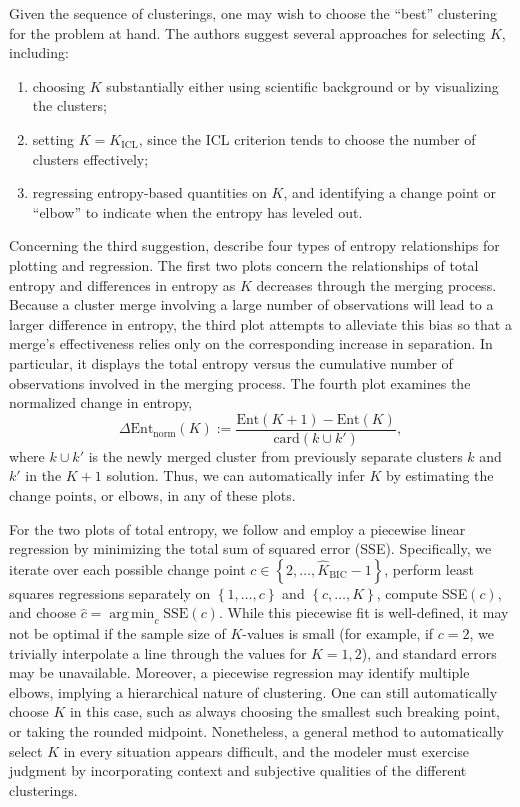 \documentclass{uwstat572}
\newcommand*\set[1]{\left\{#1\right\}}
\newcommand*\estim[1]{\widehat{#1}}
\DeclareMathOperator*{\argmin}{arg\;min}
\renewcommand\;{\,}
\begin{document}
Given the sequence of clusterings, one may wish to choose the ``best'' clustering for the problem at hand.
The authors suggest several approaches for selecting $K$, including:
\begin{enumerate}
\item
choosing $K$ substantially either using scientific background or by visualizing the clusters;
\item
setting $K = K_\text{ICL}$, since the ICL criterion tends to choose the number of clusters effectively;
\item
regressing entropy-based quantities on $K$, and identifying a change point or ``elbow'' to indicate when the entropy has leveled out.
\end{enumerate}
Concerning the third suggestion, \cite{Baudry10} describe four types of entropy relationships for plotting and regression.
The first two plots concern the relationships of total entropy and differences in entropy as $K$ decreases through the merging process.
Because a cluster merge involving a large number of observations will lead to a larger difference in entropy, the third plot attempts to alleviate this bias so that a merge's effectiveness relies only on the corresponding increase in separation.
In particular, it displays the total entropy versus the cumulative number of observations involved in the merging process.
The fourth plot examines the normalized change in entropy,
\begin{equation}
\Delta\text{Ent}_\text{norm}(K)
	:= \frac{ \text{Ent}(K + 1) - \text{Ent}(K) }{ \text{card}\left(k \cup k'\right) },
\end{equation}
where $k\cup k'$ is the newly merged cluster from previously separate clusters $k$ and $k'$ in the $K + 1$ solution.
Thus, we can automatically infer $K$ by estimating the change points, or elbows, in any of these plots.

For the two plots of total entropy, we follow \cite{Baudry10} and employ a piecewise linear regression by minimizing the total sum of squared error (SSE).
Specifically, we iterate over each possible change point $c \in \set{2, \dotsc, \estim K_\text{BIC} - 1}$, perform least squares regressions separately on $\set{1, \dotsc, c}$ and $\set{c, \dotsc, K}$, compute SSE$(c)$, and choose $\estim c = \argmin_c \text{SSE}(c)$.
While this piecewise fit is well-defined, it may not be optimal if the sample size of $K$-values is small (for example, if $c = 2$, we trivially interpolate a line through the values for $K = 1, 2$), and standard errors may be unavailable.
Moreover, a piecewise regression may identify multiple elbows, implying a hierarchical nature of clustering.
One can still automatically choose $K$ in this case, such as always choosing the smallest such breaking point, or taking the rounded midpoint.
Nonetheless, a general method to automatically select $K$ in every situation 	appears difficult, and the modeler must exercise judgment by incorporating context and subjective qualities of the different clusterings.
\end{document}
